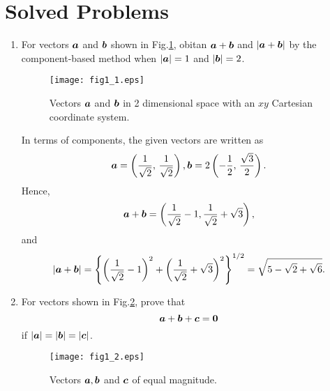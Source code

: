 \documentclass[10pt,a4j]{article}
\begin{document}
\section{Solved Problems}
\begin{enumerate}
\item
    For vectors $\mbox{\boldmath $a$}$ and $\mbox{\boldmath $b$}$ shown in Fig.\ref{fig:fig1_1}, 
    obitan $\mbox{\boldmath $a$}+\mbox{\boldmath $b$}$ and $\left| \mbox{\boldmath $a$}+\mbox{\boldmath $b$} \right|$ 
    by the component-based method when $|\mbox{\boldmath $a$}|=1$ and $|\mbox{\boldmath $b$}|=2$. \\
    \begin{figure}
        \begin{center}
        \texttt{[image: fig1\_1.eps]} 
        \end{center}
        \caption{Vectors $\mbox{\boldmath $a$}$ and $\mbox{\boldmath $b$}$ in 2 dimensional space with an $xy$ Cartesian coordinate system.}
        \label{fig:fig1_1}
    \end{figure}

    {\small
    In terms of components, the given vectors are written as 
    \[
        \mbox{\boldmath $a$}= \left( \frac{1}{\sqrt{2}}, \, \frac{1}{\sqrt{2}}\right), 
        \mbox{\boldmath $b$}=2 \left( -\frac{1}{2}, \, \frac{\sqrt{3}}{2}\right).
    \]
    Hence,
    \[
        \mbox{\boldmath $a$}+\mbox{\boldmath $b$}=\left( \frac{1}{\sqrt{2}}-1, \frac{1}{\sqrt{2}}+\sqrt{3}\right),
    \]
    and 
    \[
        | \mbox{\boldmath $a$}+\mbox{\boldmath $b$}| = 
        \left\{
        \left( \frac{1}{\sqrt{2}}-1\right)^2 +
        \left( \frac{1}{\sqrt{2}}+\sqrt{3}\right)^2
        \right\}^{1/2}
        =
		\sqrt{5-\sqrt{2}+\sqrt{6}}.
    \]
    }
\item
    For vectors shown in Fig.\ref{fig:fig1_2}, prove that 
    \[
        \mbox{\boldmath $a$}+\mbox{\boldmath $b$}+\mbox{\boldmath $c$}=\mbox{\boldmath $0$}
    \]
    if $|\mbox{\boldmath $a$}|=|\mbox{\boldmath $b$}|=|\mbox{\boldmath $c$}|$.\\
    \begin{figure}[h]
    \begin{center}
        \texttt{[image: fig1\_2.eps]} 
        \end{center}
        \caption{Vectors $\mbox{\boldmath $a$}, \mbox{\boldmath $b$}$ and $\mbox{\boldmath $c$}$ of equal magnitude.} 
        \label{fig:fig1_2}
    \end{figure}


\end{enumerate}
\end{document}
